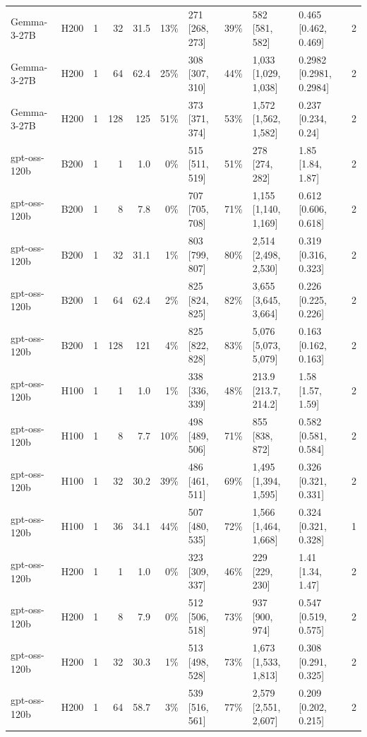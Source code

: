 \begin{landscape}
\begin{longtable}{llrrrrlrllr}
Gemma-3-27B & H200 & 1 & 32 & 31.5 & 13\% & 271 {[}268, 273{]} & 39\% & 582 {[}581, 582{]} & 0.465 {[}0.462, 0.469{]} & 2 \\
Gemma-3-27B & H200 & 1 & 64 & 62.4 & 25\% & 308 {[}307, 310{]} & 44\% & 1,033 {[}1,029, 1,038{]} & 0.2982 {[}0.2981, 0.2984{]} & 2 \\
Gemma-3-27B & H200 & 1 & 128 & 125 & 51\% & 373 {[}371, 374{]} & 53\% & 1,572 {[}1,562, 1,582{]} & 0.237 {[}0.234, 0.24{]} & 2 \\
gpt-oss-120b & B200 & 1 & 1 & 1.0 & 0\% & 515 {[}511, 519{]} & 51\% & 278 {[}274, 282{]} & 1.85 {[}1.84, 1.87{]} & 2 \\
gpt-oss-120b & B200 & 1 & 8 & 7.8 & 0\% & 707 {[}705, 708{]} & 71\% & 1,155 {[}1,140, 1,169{]} & 0.612 {[}0.606, 0.618{]} & 2 \\
gpt-oss-120b & B200 & 1 & 32 & 31.1 & 1\% & 803 {[}799, 807{]} & 80\% & 2,514 {[}2,498, 2,530{]} & 0.319 {[}0.316, 0.323{]} & 2 \\
gpt-oss-120b & B200 & 1 & 64 & 62.4 & 2\% & 825 {[}824, 825{]} & 82\% & 3,655 {[}3,645, 3,664{]} & 0.226 {[}0.225, 0.226{]} & 2 \\
gpt-oss-120b & B200 & 1 & 128 & 121 & 4\% & 825 {[}822, 828{]} & 83\% & 5,076 {[}5,073, 5,079{]} & 0.163 {[}0.162, 0.163{]} & 2 \\
gpt-oss-120b & H100 & 1 & 1 & 1.0 & 1\% & 338 {[}336, 339{]} & 48\% & 213.9 {[}213.7, 214.2{]} & 1.58 {[}1.57, 1.59{]} & 2 \\
gpt-oss-120b & H100 & 1 & 8 & 7.7 & 10\% & 498 {[}489, 506{]} & 71\% & 855 {[}838, 872{]} & 0.582 {[}0.581, 0.584{]} & 2 \\
gpt-oss-120b & H100 & 1 & 32 & 30.2 & 39\% & 486 {[}461, 511{]} & 69\% & 1,495 {[}1,394, 1,595{]} & 0.326 {[}0.321, 0.331{]} & 2 \\
gpt-oss-120b & H100 & 1 & 36 & 34.1 & 44\% & 507 {[}480, 535{]} & 72\% & 1,566 {[}1,464, 1,668{]} & 0.324 {[}0.321, 0.328{]} & 1 \\
gpt-oss-120b & H200 & 1 & 1 & 1.0 & 0\% & 323 {[}309, 337{]} & 46\% & 229 {[}229, 230{]} & 1.41 {[}1.34, 1.47{]} & 2 \\
gpt-oss-120b & H200 & 1 & 8 & 7.9 & 0\% & 512 {[}506, 518{]} & 73\% & 937 {[}900, 974{]} & 0.547 {[}0.519, 0.575{]} & 2 \\
gpt-oss-120b & H200 & 1 & 32 & 30.3 & 1\% & 513 {[}498, 528{]} & 73\% & 1,673 {[}1,533, 1,813{]} & 0.308 {[}0.291, 0.325{]} & 2 \\
gpt-oss-120b & H200 & 1 & 64 & 58.7 & 3\% & 539 {[}516, 561{]} & 77\% & 2,579 {[}2,551, 2,607{]} & 0.209 {[}0.202, 0.215{]} & 2 \\

\end{longtable}
\end{landscape}
